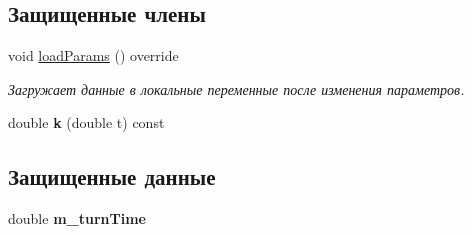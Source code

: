 \subsection*{Защищенные члены}
\begin{DoxyCompactItemize}
\item 
\hypertarget{class_tasks_1_1_continuous_discrete_1_1_landing_linear_a1845731f06868b6a22cbd7184e0358ff}{}\label{class_tasks_1_1_continuous_discrete_1_1_landing_linear_a1845731f06868b6a22cbd7184e0358ff} 
void \hyperlink{class_tasks_1_1_continuous_discrete_1_1_landing_linear_a1845731f06868b6a22cbd7184e0358ff}{load\+Params} () override
\begin{DoxyCompactList}\small\item\em Загружает данные в локальные переменные после изменения параметров. \end{DoxyCompactList}\item 
\hypertarget{class_tasks_1_1_continuous_discrete_1_1_landing_linear_a4ff79b608d0ae91f8b01c9e938eb51f2}{}\label{class_tasks_1_1_continuous_discrete_1_1_landing_linear_a4ff79b608d0ae91f8b01c9e938eb51f2} 
double {\bfseries k} (double t) const
\end{DoxyCompactItemize}
\subsection*{Защищенные данные}
\begin{DoxyCompactItemize}
\item 
\hypertarget{class_tasks_1_1_continuous_discrete_1_1_landing_linear_a838994e67eb175e03da8e736d5c00910}{}\label{class_tasks_1_1_continuous_discrete_1_1_landing_linear_a838994e67eb175e03da8e736d5c00910} 
double {\bfseries m\+\_\+turn\+Time}
\end{DoxyCompactItemize}
